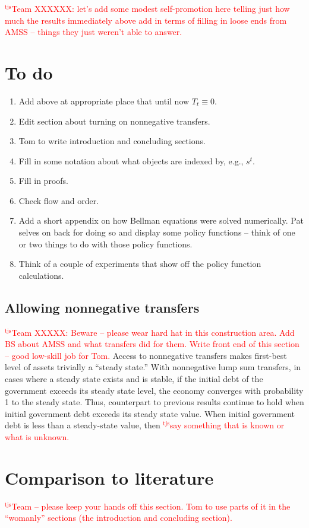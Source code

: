 \documentclass[12pt]{article}
\newcommand{\tjs}[1]{\textcolor{red}{$^{\textrm{tjs}}${#1}}}
\begin{document}
\tjs{Team XXXXXX: let's add some modest self-promotion here telling just how much the results immediately above add in terms of 
filling in loose ends from AMSS -- things they just weren't able to answer.}


\section{To do}

\begin{enumerate}
\item Add above at appropriate place that until now $T_t \equiv 0$.  
\item  Edit  section about turning on nonnegative transfers.  
\item Tom to write introduction and concluding sections.
\item Fill in some notation about what objects are indexed by, e.g., $s^t$.
\item Fill in proofs.
\item Check flow and order.
\item Add a short appendix on how Bellman equations were solved numerically. Pat selves on back for doing so and display
some policy functions -- think of one or two things to do with those policy functions.
\item Think of a couple of experiments that show off the policy function calculations.
\end{enumerate}


\subsection{Allowing nonnegative transfers}
\tjs{Team XXXXX: Beware -- please wear hard hat in this construction area.  Add BS about AMSS and what transfers did for them. Write front end of this section -- good low-skill job for Tom.}
	 Access to nonnegative transfers makes first-best level of assets trivially a ``steady state.''  	
With nonnegative lump sum transfers,  in cases where a steady state exists and is stable,  if the initial debt of the government exceeds its steady state level,  the economy  converges with probability 1 to the steady state. Thus, counterpart to previous  results continue to hold  when
initial government debt exceeds its steady state value.  When initial government debt is less than a steady-state value, then
\tjs{say something that is known or what is unknown.}


\section{Comparison to literature}
\tjs{Team -- please keep your hands off this section. Tom to use parts of it in the ``womanly'' sections (the introduction and
concluding section).}
\end{document}
